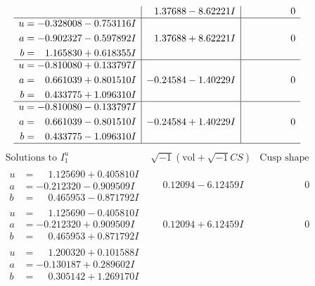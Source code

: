 \documentclass[1p]{elsarticle_modified}
\theoremstyle{definition}
\newcommand{\I}{\sqrt{-1}}
\begin{document}
$$\begin{array}{c|c|c}
 & \phantom{-}1.37688 - 8.62221 I & \phantom{-0.000000 } 0 \\ \hline\begin{aligned}
u &= -0.328008 - 0.753116 I \\
a &= -0.902327 - 0.597892 I \\
b &= \phantom{-}1.165830 + 0.618355 I\end{aligned}
 & \phantom{-}1.37688 + 8.62221 I & \phantom{-0.000000 } 0 \\ \hline\begin{aligned}
u &= -0.810080 + 0.133797 I \\
a &= \phantom{-}0.661039 + 0.801510 I \\
b &= \phantom{-}0.433775 + 1.096310 I\end{aligned}
 & -0.24584 - 1.40229 I & \phantom{-0.000000 } 0 \\ \hline\begin{aligned}
u &= -0.810080 - 0.133797 I \\
a &= \phantom{-}0.661039 - 0.801510 I \\
b &= \phantom{-}0.433775 - 1.096310 I\end{aligned}
 & -0.24584 + 1.40229 I & \phantom{-0.000000 } 0\\
 \hline 
 \end{array}$$\newpage$$\begin{array}{c|c|c}  
\text{Solutions to }I^u_{1}& \I (\text{vol} + \sqrt{-1}CS) & \text{Cusp shape}\\
 \hline 
\begin{aligned}
u &= \phantom{-}1.125690 + 0.405810 I \\
a &= -0.212320 - 0.909509 I \\
b &= \phantom{-}0.465953 - 0.871792 I\end{aligned}
 & \phantom{-}0.12094 - 6.12459 I & \phantom{-0.000000 } 0 \\ \hline\begin{aligned}
u &= \phantom{-}1.125690 - 0.405810 I \\
a &= -0.212320 + 0.909509 I \\
b &= \phantom{-}0.465953 + 0.871792 I\end{aligned}
 & \phantom{-}0.12094 + 6.12459 I & \phantom{-0.000000 } 0 \\ \hline\begin{aligned}
u &= \phantom{-}1.200320 + 0.101588 I \\
a &= -0.130187 + 0.289602 I \\
b &= \phantom{-}0.305142 + 1.269170 I\end{aligned}

\end{array}$$
\end{document}
